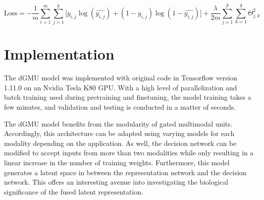 \begin{equation}
    \mathrm{Loss} = - \frac{1}{m}\sum_{i = 1}^{m}\sum_{j = 1}^{k} \lbrack y_{i,j} \log(\hat{y_{i,j}}) + (1 - y_{i,j})\log(1 - \hat{y_{i,j}}) \rbrack + \frac{\lambda}{2m} \sum_{j = 1}^{p}\sum_{k = 1}^{q}\Theta^{2}_{j,k}
\end{equation}

\section{Implementation}

The dGMU model was implemented with original code in Tensorflow version 1.11.0 on an Nvidia Tesla K80 GPU. With a high level of parallelization and batch training used during pretraining and finetuning, the model training takes a few minutes, and validation and testing is conducted in a matter of seconds.

The dGMU model benefits from the modularity of gated multimodal units. Accordingly, this architecture can be adapted using varying models for each modality depending on the application. As well, the decision network can be modified to accept inputs from more than two modalities while only resulting in a linear increase in the number of training weights. Furthermore, this model generates a latent space in between the representation network and the decision network. This offers an interesting avenue into investigating the biological significance of the fused latent representation. 